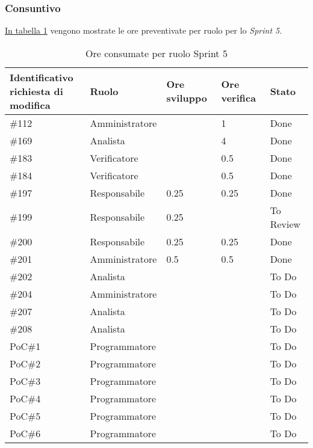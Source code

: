 \subsubsection{Consuntivo}
\label{sec:sprint5_consuntivo}
\hyperref[tab:sprint5_ore_consumate]{In tabella \ref{tab:sprint5_ore_consumate}} vengono mostrate le ore preventivate per ruolo per lo \textit{Sprint 5}.

\begin{table}[H]
    \centering
    \begin{tabular}{| l | l | l | l | l |}
        \hline
            \makecell{\textbf{Identificativo} \\ \textbf{richiesta di modifica}} &
            \textbf{Ruolo} & 
            \textbf{Ore sviluppo} &
            \textbf{Ore verifica} & 
            \textbf{Stato}\\ 
        \hline        
        \#112 & Amministratore &  & 1 & Done\\
        \hline        
        \#169 & Analista &  & 4 & Done\\
        \hline        
        \#183 & Verificatore &  & 0.5 & Done\\
        \hline        
        \#184 & Verificatore &  & 0.5 & Done\\
        \hline        
        \#197 & Responsabile & 0.25 & 0.25 & Done\\
        \hline
        \#199 & Responsabile & 0.25 & & To Review\\
        \hline
        \#200 & Responsabile & 0.25 & 0.25 & Done\\
        \hline
        \#201 & Amministratore & 0.5 & 0.5 & Done\\
        \hline
        \#202 & Analista &  &  & To Do\\
        \hline
        \#204 & Amministratore & & & To Do\\
        \hline
        \#207 & Analista &  &  & To Do\\
        \hline
        \#208 & Analista &  &  & To Do\\
        \hline
        PoC\#1 & Programmatore & & & To Do\\
        \hline
        PoC\#2 & Programmatore & & & To Do\\
        \hline
        PoC\#3 & Programmatore & & & To Do\\
        \hline
        PoC\#4 & Programmatore & & & To Do\\
        \hline
        PoC\#5 & Programmatore & & & To Do\\
        \hline
        PoC\#6 & Programmatore & & & To Do\\
        \hline
    \end{tabular}
    \caption{Ore consumate per ruolo Sprint 5}
    \label{tab:sprint5_ore_consumate} 
\end{table}